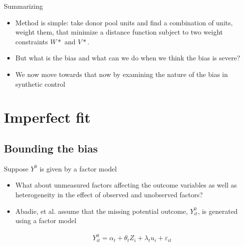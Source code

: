 \documentclass{beamer}
\begin{document}
\begin{frame}{Summarizing}

\begin{itemize}

\item Method is simple: take donor pool units and find a combination of units, weight them, that minimize a distance function subject to two weight constraints $W*$ and $V*$.
\item But what is the bias and what can we do when we think the bias is severe?
\item We now move towards that now by examining the nature of the bias in synthetic control
\end{itemize}

\end{frame}

\section{Imperfect fit}

\subsection{Bounding the bias}

\begin{frame}{Suppose $Y^0$ is given by a factor model}


\begin{itemize}
\item What about unmeasured factors affecting the outcome variables as well as heterogeneity in the effect of observed and unobserved factors?

\item Abadie, et al. assume that the missing potential outcome, $Y^0_{it}$, is generated using a factor model

\begin{eqnarray*}
Y_{it}^0 = \alpha_t + \theta_t Z_i + \lambda_t u_i + \varepsilon_{it}
\end{eqnarray*}


\end{itemize}

\end{frame}
\end{document}
